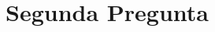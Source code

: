\documentclass[spanish]{article}
\begin{document}

%

\section{Segunda Pregunta}
\label{sec:p2}


%


\end{document}
